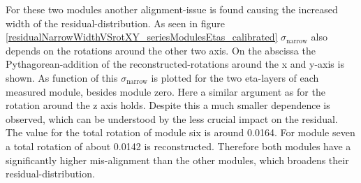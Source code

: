 \documentclass[
twoside,            %
BCOR1.4cm,          %
10pt,               %
headings=normal,    %
headsepline,        %
clearplainpage,		%
final,              %
div=14,
open=right,
bibliography=toc
]{scrreprt}
\begin{document}
For these two modules another alignment-issue is found causing the increased width of the residual-distribution.
As seen in figure \ref{residualNarrowWidthVSrotXY_seriesModulesEtas_calibrated} $\sigma_{\mathrm{narrow}}$ also depends on the rotations around the other two axis.
On the abscissa the Pythagorean-addition of the reconstructed-rotations around the x and y-axis is shown.
As function of this $\sigma_{\mathrm{narrow}}$ is plotted for the two eta-layers of each measured module, besides module zero.
Here a similar argument as for the rotation around the z axis holds. 
Despite this a much smaller dependence is observed, which can be understood by the less crucial impact on the residual.
The value for the total rotation of module six is around 0.0164.
For module seven a total rotation of about 0.0142 is reconstructed.
Therefore both modules have a significantly higher mis-alignment than the other modules, which broadens their residual-distribution.
\end{document}

